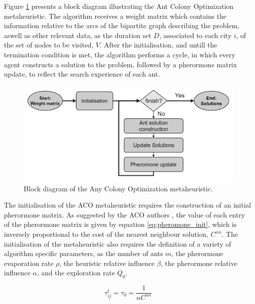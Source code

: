 Figure \ref{fig:aco_block_diagram} presents a block diagram illustrating the Ant Colony Optimization metaheuristic.
The algorithm receives a weight matrix which contains the information relative to the arcs of the bipartite graph describing the problem,
aswell as other relevant data, as the duration set $D$, associated to each city $i$, of the set of nodes to be visited, $V$.
After the initialisation, and untill the termination condition is met,
the algorithm performs a cycle, in which every agent constructs a solution to the problem, 
followed by a pherormone matrix update, to reflect the search experience of each ant.

\begin{figure}[htpb]
  \centering
  \includegraphics[width=\textwidth]{./Figures/system_implementation/aco_base.png}
  \caption{Block diagram of the Any Colony Optimization metaheuristic.}
  \label{fig:aco_block_diagram}  
\end{figure}

The initialisation of the ACO metaheuristic requires the construction of an initial pherormone matrix.
As suggested by the ACO authors \cite{aco_2},
the value of each entry of the pherormone matrix is given by equation \ref{eq:pheromone_init},
which is inversely proportional to the cost of the nearest neighbour solution, $C^{nn}$.
The initialisation of the metaheuristic also requires the definition of a variety of
algorithm specific parameters, as the number of ants $m$, the pherormone evaporation rate $\rho$,
the heuristic relative influence $\beta$, the pherormone relative influence $\alpha$,
and the exploration rate $Q_0$. 

\begin{equation}
\label{eq:pheromone_init}
  \tau_{ij}^{t} = \tau_{0} = \frac{1}{nC^{nn}}
\end{equation}

